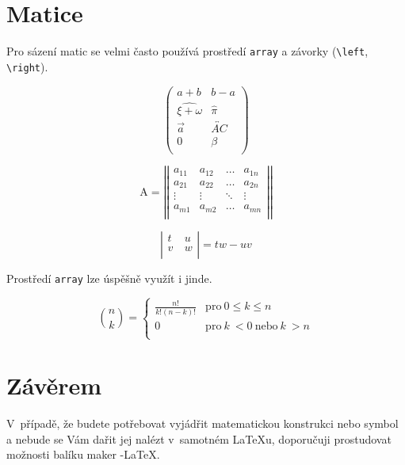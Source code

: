 \documentclass[a4paper,twocolumn,11pt]{article}
\theoremstyle{definition}
\theoremstyle{remark}
\begin{document}
	\section{Matice}
	
	Pro sázení matic se velmi často používá prostředí \texttt{array} a závorky (\verb+\left+, \verb+\right+). 
	
	\[
	\left( 
	\begin{array}{ccc}
		a + b & b - a  \\
		\widehat{\xi + \omega} & \hat{\pi}  \\
		\vec{a} & \overleftrightarrow{AC}   \\
		0 & \beta  \\
	\end{array} \right)
	\]
	
	\[ 
	\text{A} = 
	\left|\left| 
	\begin{array}{cccc}
	a_{11} & a_{12} & \ldots & a_{1n} \\
	a_{21} & a_{22} & \ldots & a_{2n} \\
	\vdots & \vdots & \ddots & \vdots \\
	a_{m1} & a_{m2} & \ldots & a_{mn} \\
	\end{array} 
	\right|\right|
	\]
	
	\[ 
	\left| 
	\begin{array}{cc}
	t & u\\
	v~& w\\
	\end{array}
	\right|
	= tw - uv
	\]
	
Prostředí \texttt{array} lze úspěšně využít i jinde.

\[
\binom {n} {k}
= 
\begin{cases}
\frac{n!}{k!\left(n-k\right)!} & \mathrm{pro}\ 0\leq k\leq n\\
0              & \mathrm{pro}\ k~< 0\ \mathrm{nebo}  \ k~> n\\
\end{cases}
\]	

	
	\section{Závěrem}
	
	V~případě, že budete potřebovat vyjádřit matematickou konstrukci nebo symbol a nebude se Vám dařit jej nalézt v~samotném \LaTeX u, doporučuji prostudovat možnosti balíku maker \AmS-\LaTeX .
	
	
\end{document}
